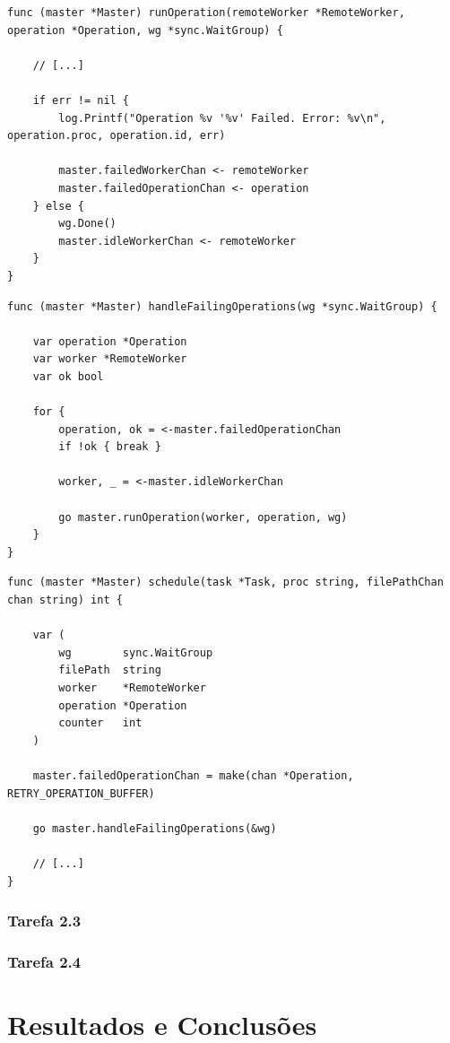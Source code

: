 \documentclass[conference]{IEEEtran}
\begin{document}
\begin{lstlisting}
func (master *Master) runOperation(remoteWorker *RemoteWorker, operation *Operation, wg *sync.WaitGroup) {

	// [...]

	if err != nil {
		log.Printf("Operation %v '%v' Failed. Error: %v\n", operation.proc, operation.id, err)
		
		master.failedWorkerChan <- remoteWorker
		master.failedOperationChan <- operation
	} else {
		wg.Done()
		master.idleWorkerChan <- remoteWorker
	}
}
\end{lstlisting}

\begin{lstlisting}
func (master *Master) handleFailingOperations(wg *sync.WaitGroup) {

	var operation *Operation
	var worker *RemoteWorker
	var ok bool

	for {
		operation, ok = <-master.failedOperationChan
		if !ok { break }

		worker, _ = <-master.idleWorkerChan

		go master.runOperation(worker, operation, wg)
	}
}
\end{lstlisting}

\begin{lstlisting}
func (master *Master) schedule(task *Task, proc string, filePathChan chan string) int {

	var (
		wg        sync.WaitGroup
		filePath  string
		worker    *RemoteWorker
		operation *Operation
		counter   int
	)
	
	master.failedOperationChan = make(chan *Operation, RETRY_OPERATION_BUFFER)

	go master.handleFailingOperations(&wg)

	// [...]
}
\end{lstlisting}

\subsubsection{Tarefa 2.3}

\subsubsection{Tarefa 2.4}


\section{Resultados e Conclusões} \label{results}
\end{document}
